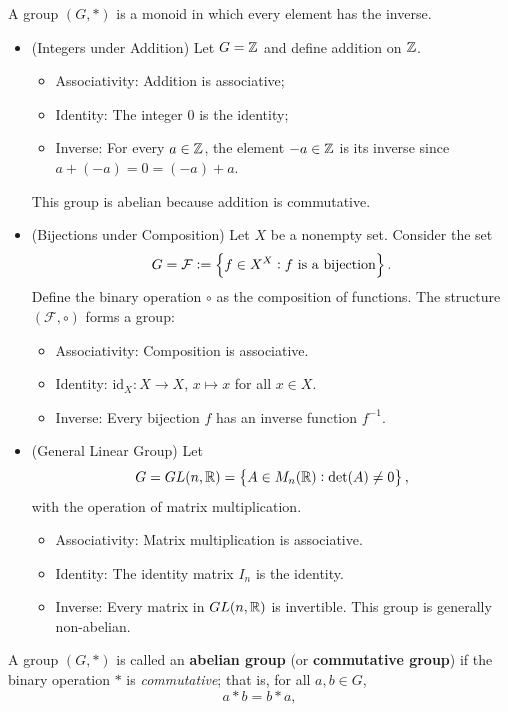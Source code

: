 \documentclass[11pt,openany]{article}
\begin{document}
\begin{example}
A group $(G,*)$ is a monoid in which every element has the inverse. \begin{itemize}
	\item (Integers under Addition) Let $G=\mathbb{Z}$ and define addition on $\mathbb{Z}$. \begin{itemize}
		\item Associativity: Addition is associative;
		\item Identity: The integer $0$ is the identity;
		\item Inverse: For every $a\in\mathbb{Z}$, the element $-a\in\mathbb{Z}$ is its inverse since $a+(-a)=0=(-a)+a$. 
	\end{itemize}
	This group is abelian because addition is commutative.
	\vspace{20pt}
	\item (Bijections under Composition) Let $X$ be a nonempty set. Consider the set \[
	G=\mathcal{F}:=\set{f\in X^X:f\ \text{is a bijection}}.
	\] Define the binary operation $\circ$ as the composition of functions. The structure $(\mathcal{F},\circ)$ forms a group: \begin{itemize}
		\item Associativity: Composition is associative.
		\item Identity: $\text{id}_X:X\to X$, $x\mapsto x$ for all $x\in X$.
		\item Inverse: Every bijection $f$ has an inverse function $f^{-1}$.
 	\end{itemize}
	\item (General Linear Group) Let \[
	G=GL(n,\mathbb{R})=\set{A\in M_n(\mathbb{R}):\det(A)\neq 0},
	\] with the operation of matrix multiplication. \begin{itemize}
		\item Associativity: Matrix multiplication is associative.
		\item Identity: The identity matrix $I_n$ is the identity.
		\item Inverse: Every matrix in $GL(n,\mathbb{R})$ is invertible. This group is generally non-abelian.
	\end{itemize}
\end{itemize}
\end{example}
\vspace{40pt}
\begin{remark}
A group $(G,*)$ is called an \textbf{abelian group} (or \textbf{commutative group}) if the binary operation $*$ is \textit{commutative}; that is, for all $a,b\in G$,
\[
a * b = b * a,
\]
\end{remark}
\end{document}
